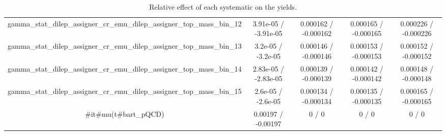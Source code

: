 \documentclass[10pt]{article}
\begin{document}
\begin{table}[htbp]
\begin{center}
\begin{tabular}{|c|c|c|c|c|}
  gamma_stat_dilep_assigner_cr_emu_dilep_assigner_top_mass_bin_12 & 3.91e-05 / -3.91e-05 & 0.000162 / -0.000162 & 0.000165 / -0.000165 & 0.000226 / -0.000226 \\ 
  gamma_stat_dilep_assigner_cr_emu_dilep_assigner_top_mass_bin_13 & 3.2e-05 / -3.2e-05 & 0.000146 / -0.000146 & 0.000153 / -0.000153 & 0.000152 / -0.000152 \\ 
  gamma_stat_dilep_assigner_cr_emu_dilep_assigner_top_mass_bin_14 & 2.83e-05 / -2.83e-05 & 0.000139 / -0.000139 & 0.000142 / -0.000142 & 0.000148 / -0.000148 \\ 
  gamma_stat_dilep_assigner_cr_emu_dilep_assigner_top_mass_bin_15 & 2.6e-05 / -2.6e-05 & 0.000134 / -0.000134 & 0.000135 / -0.000135 & 0.000165 / -0.000165 \\ 
  #it{#mu}(t#bar{t}_{pQCD}) & 0.00197 / -0.00197 & 0 / 0 & 0 / 0 & 0 / 0 \\ 
\hline 
\end{tabular} 
\caption{Relative effect of each systematic on the yields.} 
\end{center} 
\end{table} 
\end{document}
